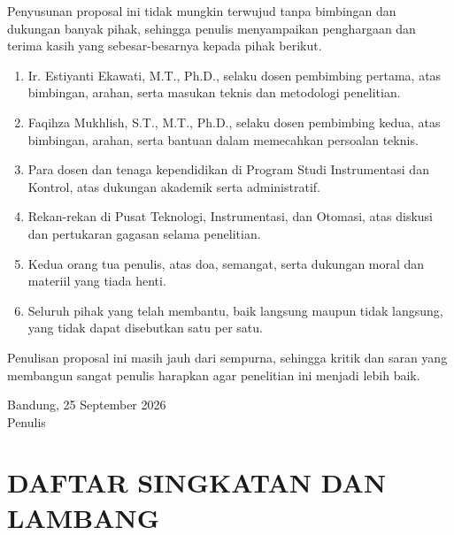 \documentclass[12pt,a4paper]{report}
\begin{document}
Penyusunan proposal ini tidak mungkin terwujud tanpa bimbingan dan dukungan banyak pihak, sehingga penulis menyampaikan penghargaan dan terima kasih yang sebesar-besarnya kepada pihak berikut.

\begin{enumerate}
    \item Ir. Estiyanti Ekawati, M.T., Ph.D., selaku dosen pembimbing pertama, atas bimbingan, arahan, serta masukan teknis dan metodologi penelitian.
    \item Faqihza Mukhlish, S.T., M.T., Ph.D., selaku dosen pembimbing kedua, atas bimbingan, arahan, serta bantuan dalam memecahkan persoalan teknis.
    \item Para dosen dan tenaga kependidikan di Program Studi Instrumentasi dan Kontrol, atas dukungan akademik serta administratif.
    \item Rekan-rekan di Pusat Teknologi, Instrumentasi, dan Otomasi, atas diskusi dan pertukaran gagasan selama penelitian.
    \item Kedua orang tua penulis, atas doa, semangat, serta dukungan moral dan materiil yang tiada henti.
    \item Seluruh pihak yang telah membantu, baik langsung maupun tidak langsung, yang tidak dapat disebutkan satu per satu.
\end{enumerate}

Penulisan proposal ini masih jauh dari sempurna, sehingga kritik dan saran yang membangun sangat penulis harapkan agar penelitian ini menjadi lebih baik.

\vspace{0.6cm}
\begin{flushright}
    Bandung, 25 September 2026\\[1.4cm]
    Penulis
\end{flushright}

\clearpage
\tableofcontents
\clearpage

\clearpage
{}
\listoffigures
\clearpage

\clearpage
{}
\listoftables
\clearpage

\chapter*{DAFTAR SINGKATAN DAN LAMBANG}
\end{document}

